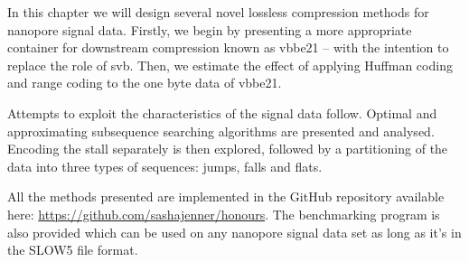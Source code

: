 In this chapter we will design several novel lossless compression methods for
nanopore signal data.
Firstly, we begin by presenting a more appropriate container for downstream
compression known as vbbe21 -- with the intention to replace the role of svb.
Then, we estimate the effect of applying Huffman coding and range coding to the
one byte data of vbbe21.

Attempts to exploit the characteristics of the signal data follow. Optimal and
approximating subsequence searching algorithms are presented and analysed.
Encoding the stall separately is then explored, followed by a partitioning of the
data into three types of sequences: jumps, falls and flats.

All the methods presented are implemented in the GitHub repository available
here: \url{https://github.com/sashajenner/honours}. The benchmarking program is
also provided which can be used on any nanopore signal data set as long as it's
in the SLOW5 file format.

